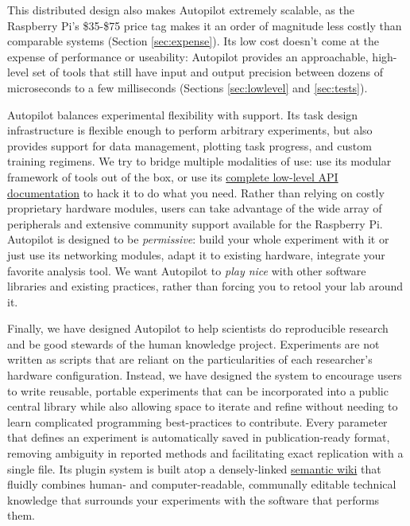 This distributed design also makes Autopilot extremely scalable, as the Raspberry Pi's \$35-\$75 price tag makes it an order of magnitude less costly than comparable systems (Section \ref{sec:expense}). Its low cost doesn't come at the expense of performance or useability: Autopilot provides an approachable, high-level set of tools that still have input and output precision between dozens of microseconds to a few milliseconds (Sections \ref{sec:lowlevel} and \ref{sec:tests}).

Autopilot balances experimental flexibility with support. Its task design infrastructure is flexible enough to perform arbitrary experiments, but also provides support for data management, plotting task progress, and custom training regimens. We try to bridge multiple modalities of use: use its modular framework of tools out of the box, or use its \href{https://docs.auto-pi-lot.com}{complete low-level API documentation} to hack it to do what you need. Rather than relying on costly proprietary hardware modules, users can take advantage of the wide array of peripherals and extensive community support available for the Raspberry Pi. Autopilot is designed to be \textit{permissive}: build your whole experiment with it or just use its networking modules, adapt it to existing hardware, integrate your favorite analysis tool. We want Autopilot to \textit{play nice} with other software libraries and existing practices, rather than forcing you to retool your lab around it.

Finally, we have designed Autopilot to help scientists do reproducible research and be good stewards of the human knowledge project. Experiments are not written as scripts that are reliant on the particularities of each researcher's hardware configuration. Instead, we have designed the system to encourage users to write reusable, portable experiments that can be incorporated into a public central library while also allowing space to iterate and refine without needing to learn complicated programming best-practices to contribute. Every parameter that defines an experiment is automatically saved in  publication-ready format, removing ambiguity in reported methods and facilitating exact replication with a single file. Its plugin system is built atop a densely-linked \href{https://wiki-auto-pi-lot.com}{semantic wiki} that fluidly combines human- and computer-readable, communally editable technical knowledge that surrounds your experiments with the software that performs them.

